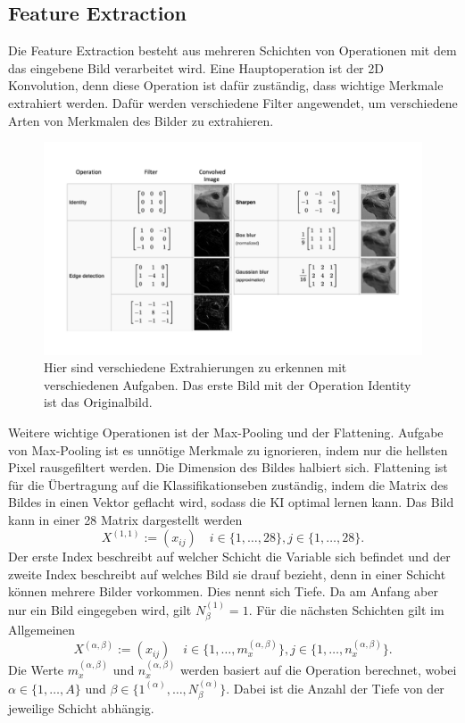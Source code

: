 \documentclass[11pt]{article}
\begin{document}
\subsection{Feature Extraction}\label{feature}
Die Feature Extraction besteht aus mehreren Schichten von Operationen mit dem das eingebene Bild verarbeitet wird.
Eine Hauptoperation ist der 2D Konvolution, denn diese Operation ist dafür zuständig, dass wichtige Merkmale extrahiert werden.
Dafür werden verschiedene Filter angewendet, um verschiedene Arten von Merkmalen des Bilder zu extrahieren.
\begin{figure}[h]
    \centering
    \includegraphics[width=400pt, keepaspectratio]{images/filter}
    \caption[Verschiedene Extraktionsmöglichkeiten]{Hier sind verschiedene Extrahierungen zu erkennen mit verschiedenen Aufgaben. Das erste Bild mit der Operation Identity ist das Originalbild.}\label{kernel}
\end{figure}
Weitere wichtige Operationen ist der Max-Pooling und der Flattening. Aufgabe von Max-Pooling ist es unnötige Merkmale
zu ignorieren, indem nur die hellsten Pixel rausgefiltert werden. Die Dimension des Bildes halbiert sich. Flattening ist für die Übertragung auf die Klassifikationseben zuständig,
indem die Matrix des Bildes in einen Vektor geflacht wird, sodass die KI optimal lernen kann.
Das Bild kann in einer 28 Matrix dargestellt werden
\begin{equation}
    X^{(1,1)} := (x_{ij}) \quad i \in \{1,\ldots,28\}, j \in \{1,\ldots,28\}.
\end{equation}
Der erste Index beschreibt auf welcher Schicht die Variable sich befindet und der zweite Index beschreibt auf welches
Bild sie drauf bezieht, denn in einer Schicht können mehrere Bilder vorkommen. Dies nennt sich Tiefe. Da am Anfang aber nur ein Bild eingegeben wird, gilt
$N_{\beta}^{(1)} = 1$. Für die nächsten Schichten gilt im Allgemeinen
\begin{equation}\label{newlayer}
    X^{(\alpha,\beta)} := (x_{ij}) \quad i \in \{1,\ldots,m_{x}^{(\alpha,\beta)}\}, j \in \{1,\ldots,n_{x}^{(\alpha,\beta)}\}.
\end{equation}
Die Werte $m_{x}^{(\alpha,\beta)}$ und $n_{x}^{(\alpha,\beta)}$ werden basiert auf die Operation berechnet, wobei
$\alpha \in \{1,\ldots,A\}$ und $\beta \in \{1^{(\alpha)},\ldots,N_{\beta}^{(\alpha)}\}$. Dabei ist die Anzahl der Tiefe von der jeweilige Schicht abhängig.
\end{document}
